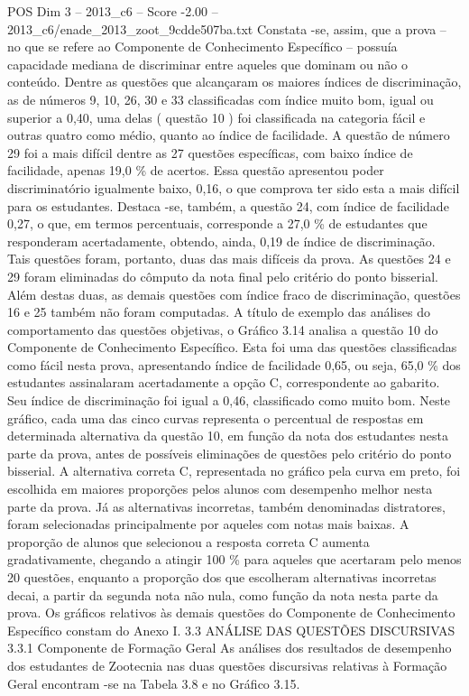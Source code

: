 \begin{textsample}{POS Dim 3 – 2013\_c6 – Score -2.00 – 2013\_c6/enade\_2013\_zoot\_9cdde507ba.txt}
Constata -se, assim, que a prova – no que se refere ao Componente de Conhecimento Específico – possuía capacidade mediana de discriminar entre aqueles que dominam ou não o conteúdo.
Dentre as questões que alcançaram os maiores índices de discriminação, as de números 9, 10, 26, 30 e 33 classificadas com índice muito bom, igual ou superior a 0,40, uma delas ( questão 10 ) foi classificada na categoria fácil e outras quatro como médio, quanto ao índice de facilidade.
A questão de número 29 foi a mais difícil dentre as 27 questões específicas, com baixo índice de facilidade, apenas 19,0 \% de acertos.
Essa questão apresentou poder discriminatório igualmente baixo, 0,16, o que comprova ter sido esta a mais difícil para os estudantes.
Destaca -se, também, a questão 24, com índice de facilidade 0,27, o que, em termos percentuais, corresponde a 27,0 \% de estudantes que responderam acertadamente, obtendo, ainda, 0,19 de índice de discriminação.
Tais questões foram, portanto, duas das mais difíceis da prova.
As questões 24 e 29 foram eliminadas do cômputo da nota final pelo critério do ponto bisserial.
Além destas duas, as demais questões com índice fraco de discriminação, questões 16 e 25 também não foram computadas.
A título de exemplo das análises do comportamento das questões objetivas, o Gráfico 3.14 analisa a questão 10 do Componente de Conhecimento Específico.
Esta foi uma das questões classificadas como fácil nesta prova, apresentando índice de facilidade 0,65, ou seja, 65,0 \% dos estudantes assinalaram acertadamente a opção C, correspondente ao gabarito.
Seu índice de discriminação foi igual a 0,46, classificado como muito bom.
Neste gráfico, cada uma das cinco curvas representa o percentual de respostas em determinada alternativa da questão 10, em função da nota dos estudantes nesta parte da prova, antes de possíveis eliminações de questões pelo critério do ponto bisserial.
A alternativa correta C, representada no gráfico pela curva em preto, foi escolhida em maiores proporções pelos alunos com desempenho melhor nesta parte da prova.
Já as alternativas incorretas, também denominadas distratores, foram selecionadas principalmente por aqueles com notas mais baixas.
A proporção de alunos que selecionou a resposta correta C aumenta gradativamente, chegando a atingir 100 \% para aqueles que acertaram pelo menos 20 questões, enquanto a proporção dos que escolheram alternativas incorretas decai, a partir da segunda nota não nula, como função da nota nesta parte da prova.
Os gráficos relativos às demais questões do Componente de Conhecimento Específico constam do Anexo I. 3.3 ANÁLISE DAS QUESTÕES DISCURSIVAS 3.3.1 Componente de Formação Geral As análises dos resultados de desempenho dos estudantes de Zootecnia nas duas questões discursivas relativas à Formação Geral encontram -se na Tabela 3.8 e no Gráfico 3.15.

\end{textsample}
